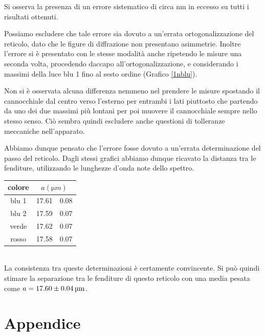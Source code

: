 \documentclass[italian,a4paper]{article}
\begin{document}
Si osserva la presenza di un errore sistematico di circa \unit[10]{nm} in eccesso su tutti i risultati ottenuti.

Possiamo escludere che tale errore sia dovuto a un'errata ortogonalizzazione
del reticolo, dato che le figure di diffrazione non presentano asimmetrie.
Inoltre l'errore si è presentato con le stesse modalità anche ripetendo le
misure una seconda volta, procedendo daccapo
all'ortogonalizzazione, e considerando i massimi della luce blu 1 fino al sesto ordine (Grafico \ref{1nblu}).

Non si è osservata alcuna differenza nemmeno nel prendere le misure spostando il cannocchiale dal centro verso l'esterno per entrambi i lati piuttosto che partendo da uno dei due massimi più lontani per poi muovere il cannocchiale sempre nello stesso senso. Ciò sembra quindi escludere anche questioni di tolleranze meccaniche nell'apparato.

Abbiamo dunque pensato che l'errore fosse dovuto a un'errata determinazione
del passo del reticolo. Dagli stessi grafici abbiamo dunque ricavato la
distanza tra le fenditure, utilizzando le lunghezze d'onda note dello
spettro. 
\begin{table}[!h]
\centering
\renewcommand{\arraystretch}{1.3}
\begin{tabular}{cr@{ $\pm$ }l}
colore&	\multicolumn{2}{c}{$a (\unit{\micro m})$} \\\hline
blu 1& 		17.61& 0.08 \\
blu 2& 		17.59& 0.07 \\
verde& 		17.62& 0.07 \\
rosso& 		17.58& 0.07 \\
\end{tabular}
\end{table}\\
La consistenza tra queste determinazioni è certamente convincente. Si può
quindi stimare la separazione tra le fenditure di questo reticolo con una
media pesata come $a=\unit[17.60\pm0.04]{\micro m}$.
\newpage
\section{Appendice}
\end{document}
